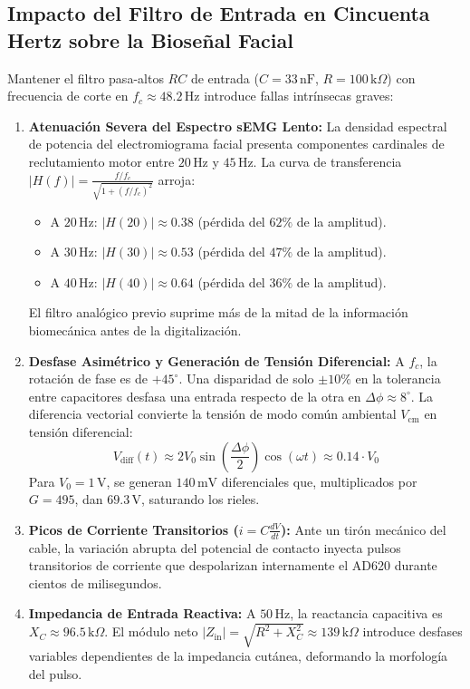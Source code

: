 \documentclass[11pt,a4paper]{article}
\begin{document}
\subsection{Impacto del Filtro de Entrada en Cincuenta Hertz sobre la Bioseñal Facial}
Mantener el filtro pasa-altos $RC$ de entrada ($C = 33\,\text{nF}$, $R = 100\,\text{k}\Omega$) con frecuencia de corte en $f_c \approx 48.2\,\text{Hz}$ introduce fallas intrínsecas graves:
\begin{enumerate}
    \item \textbf{Atenuación Severa del Espectro sEMG Lento:}  
    La densidad espectral de potencia del electromiograma facial presenta componentes cardinales de reclutamiento motor entre $20\,\text{Hz}$ y $45\,\text{Hz}$. La curva de transferencia $|H(f)| = \frac{f/f_c}{\sqrt{1 + (f/f_c)^2}}$ arroja:
    \begin{itemize}
        \item A $20\,\text{Hz}$: $|H(20)| \approx 0.38$ (pérdida del $62\%$ de la amplitud).
        \item A $30\,\text{Hz}$: $|H(30)| \approx 0.53$ (pérdida del $47\%$ de la amplitud).
        \item A $40\,\text{Hz}$: $|H(40)| \approx 0.64$ (pérdida del $36\%$ de la amplitud).
    \end{itemize}
    El filtro analógico previo suprime más de la mitad de la información biomecánica antes de la digitalización.
    \item \textbf{Desfase Asimétrico y Generación de Tensión Diferencial:}  
    A $f_c$, la rotación de fase es de $+45^\circ$. Una disparidad de solo $\pm 10\%$ en la tolerancia entre capacitores desfasa una entrada respecto de la otra en $\Delta\phi \approx 8^\circ$. La diferencia vectorial convierte la tensión de modo común ambiental $V_{\text{cm}}$ en tensión diferencial:
    \begin{equation}
    V_{\text{diff}}(t) \approx 2 V_0 \sin\left(\frac{\Delta\phi}{2}\right) \cos(\omega t) \approx 0.14 \cdot V_0
    \end{equation}
    Para $V_0 = 1\,\text{V}$, se generan $140\,\text{mV}$ diferenciales que, multiplicados por $G=495$, dan $69.3\,\text{V}$, saturando los rieles.
    \item \textbf{Picos de Corriente Transitorios ($i = C \frac{dV}{dt}$):}  
    Ante un tirón mecánico del cable, la variación abrupta del potencial de contacto inyecta pulsos transitorios de corriente que despolarizan internamente el AD620 durante cientos de milisegundos.
    \item \textbf{Impedancia de Entrada Reactiva:}  
    A $50\,\text{Hz}$, la reactancia capacitiva es $X_C \approx 96.5\,\text{k}\Omega$. El módulo neto $|Z_{\text{in}}| = \sqrt{R^2 + X_C^2} \approx 139\,\text{k}\Omega$ introduce desfases variables dependientes de la impedancia cutánea, deformando la morfología del pulso.
\end{enumerate}
\end{document}
